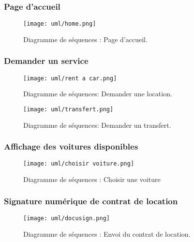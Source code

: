 \subsubsection{Page d'accueil}
\begin{figure}[H]
    \centering
    \texttt{[image: uml/home.png]}
    \vspace{1cm}
    \caption{Diagramme de séquences : Page d'accueil.}
    \label{fig:seq_home}
\end{figure}
\subsubsection{Demander un service}
\begin{figure}[H]
    \centering
    \texttt{[image: uml/rent a car.png]}
    \vspace{1cm}
    \captionsetup{justification=centering}

    \caption{Diagramme de séquences: Demander une location.}
    \label{fig:seq_location}
\end{figure}
\vspace{1cm}
\begin{figure}[H]
    \centering
    \texttt{[image: uml/transfert.png]}
    \vspace{1cm}
    \captionsetup{justification=centering}

    \caption{Diagramme de séquences: Demander un transfert.}
    \label{fig:seq_transfert}
\end{figure}
\subsubsection{Affichage des voitures disponibles}
\begin{figure}[H]
    \centering
    \texttt{[image: uml/choisir voiture.png]}
    \vspace{1cm}
    \captionsetup{justification=centering}

    \caption{Diagramme de séquences : Choisir une voiture}
    \label{fig:seq_car_select}
\end{figure}
\subsubsection{Signature numérique de contrat de location}
\begin{figure}[H]
    \centering
    \texttt{[image: uml/docusign.png]}
    \captionsetup{justification=centering}
    \caption{Diagramme de séquences : Envoi du contrat de location.}
    \label{fig:seq_location_contract}
\end{figure}
